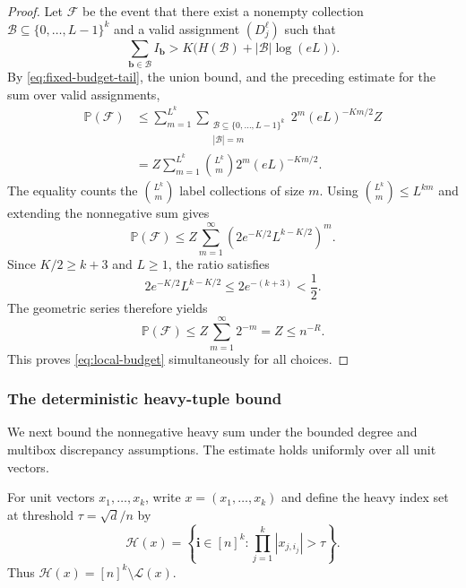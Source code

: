 \documentclass[10pt,a4paper]{amsart}
\numberwithin{equation}{section}
\newcommand{\Pp}{\mathbb P}
\begin{document}
\begin{proof}
Let $\mathcal F$ be the event that there exist a nonempty collection
$\mathcal B\subseteq\{0,\ldots,L-1\}^k$ and a valid assignment
$(D_j^\ell)$ such that
\[
 \sum_{\mathbf{b}\in\mathcal B}I_{\mathbf{b}}>
 K\bigl(H(\mathcal B)+|\mathcal B|\log(eL)\bigr).
\]
By \eqref{eq:fixed-budget-tail}, the union bound, and the preceding
estimate for the sum over valid assignments,
\begin{align*}
 \Pp(\mathcal F)
 &\le\sum_{m=1}^{L^k}
     \sum_{\substack{\mathcal B\subseteq\{0,\ldots,L-1\}^k\\|\mathcal B|=m}}
       2^m(eL)^{-Km/2}Z\\
 &=Z\sum_{m=1}^{L^k}\binom{L^k}{m}2^m(eL)^{-Km/2}.
\end{align*}
The equality counts the $\binom{L^k}{m}$ label collections of size $m$.
Using $\binom{L^k}{m}\le L^{km}$ and extending the nonnegative sum gives
\[
 \Pp(\mathcal F)
 \le Z\sum_{m=1}^\infty
       \left(2e^{-K/2}L^{k-K/2}\right)^m.
\]
Since $K/2\ge k+3$ and $L\ge1$, the ratio satisfies
\[
 2e^{-K/2}L^{k-K/2}\le2e^{-(k+3)}<\frac12.
\]
The geometric series therefore yields
\[
 \Pp(\mathcal F)\le Z\sum_{m=1}^\infty2^{-m}=Z\le n^{-R}.
\]
This proves \eqref{eq:local-budget} simultaneously for all choices.
\end{proof}

\subsubsection{The deterministic heavy-tuple bound}\label{sec:heavy-sum}

We next bound the nonnegative heavy sum under the bounded degree
and multibox discrepancy assumptions. The estimate holds uniformly
over all unit vectors. 

For unit vectors $x_1,\ldots,x_k$, write $x=(x_1,\ldots,x_k)$ and
define the heavy index set at threshold $\tau=\sqrt d/n$ by
\[
 \mathcal H(x)=\left\{\mathbf i\in[n]^k:
                  \prod_{j=1}^k|x_{j,i_j}|>\tau\right\}.
\]
Thus $\mathcal H(x)=[n]^k\setminus\mathcal L(x)$.
\end{document}
